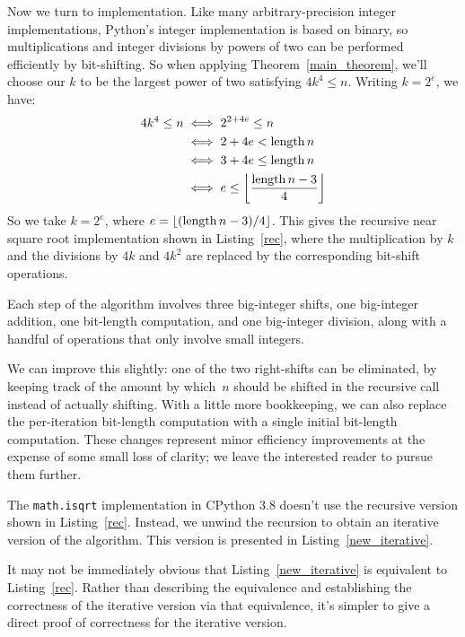 \documentclass[a4paper]{article}
\DeclarePairedDelimiter\floor{\lfloor}{\rfloor}
\DeclareMathOperator{\length}{length}
\theoremstyle{plain}
\theoremstyle{definition}
\begin{document}
Now we turn to implementation. Like many arbitrary-precision integer
implementations, Python's integer implementation is based on binary, so
multiplications and integer divisions by powers of two can be performed
efficiently by bit-shifting. So when applying Theorem~\ref{main_theorem}, we'll
choose our $k$ to be the largest power of two satisfying $4k^4 \le n$. Writing
$k=2^e$, we have:
\begin{align*}
  4k^4 \le n
  &\iff 2^{2 + 4e} \le n \\
  &\iff 2 + 4e < \length n \\
  &\iff 3 + 4e \le \length n \\
  &\iff e \le \floor*{\frac{\length n - 3}{4}}
\end{align*}
So we take $k = 2^e$, where $e={\floor{(\length n - 3)/4}}$. This gives the recursive
near square root implementation shown in Listing~\ref{rec}, where the
multiplication by $k$ and the divisions by $4k$ and $4k^2$ are replaced by the
corresponding bit-shift operations.



Each step of the algorithm involves three big-integer shifts, one
big-integer addition, one bit-length computation, and one big-integer division,
along with a handful of operations that only involve small integers.

We can improve this slightly: one of the two right-shifts can be eliminated, by
keeping track of the amount by which~$n$ should be shifted in the recursive
call instead of actually shifting. With a little more bookkeeping, we can
also replace the per-iteration bit-length computation with a single
initial bit-length computation. These changes represent minor efficiency
improvements at the expense of some small loss of clarity; we leave the
interested reader to pursue them further.

The \lstinline{math.isqrt} implementation in CPython 3.8 doesn't use the
recursive version shown in Listing~\ref{rec}. Instead, we unwind the recursion
to obtain an iterative version of the algorithm. This version is presented in
Listing~\ref{new_iterative}.



It may not be immediately obvious that Listing~\ref{new_iterative} is
equivalent to Listing~\ref{rec}. Rather than describing the equivalence and
establishing the correctness of the iterative version via that equivalence,
it's simpler to give a direct proof of correctness for the iterative version.
\end{document}
